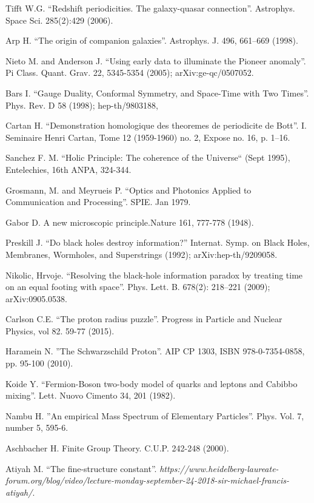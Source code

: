 \documentclass[twoside,draft]{article}
\begin{document}
\begin{sloppypar}
\begin{thebibliography}{99}
 Tifft W.G. ``Redshift periodicities. The galaxy-quasar
connection''. Astrophys. Space Sci. 285(2):429 (2006).

 Arp H. ``The origin of companion galaxies''. Astrophys. J. 496,
661--669 (1998).

 Nieto M. and Anderson J. ``Using early data to illuminate the
Pioneer anomaly''. Pi Class. Quant. Grav. 22, 5345-5354 (2005);
arXiv:ge-qc/0507052.

 Bars I. ``Gauge Duality, Conformal Symmetry, and Space-Time with
Two Times''. Phys. Rev. D 58 (1998); hep-th/9803188, 

 Cartan H. ``Demonstration homologique des theoremes de periodicite
de Bott''. I. Seminaire Henri Cartan, Tome 12 (1959-1960) no. 2, Expose no. 16,
p. 1--16.

 Sanchez F. M. ``Holic Principle: The coherence of the Universe`` (Sept 1995), Entelechies, 16th ANPA, 324-344.

 Grosmann, M. and Meyrueis P. ``Optics and Photonics Applied to Communication and Processing''. SPIE.  Jan 1979.

 Gabor D. A new microscopic principle.Nature 161, 777-778 (1948). 

 Preskill J. ``Do black holes destroy information?'' Internat.
Symp. on Black Holes, Membranes, Wormholes, and Superstrings (1992);
arXiv:hep-th/9209058.

 Nikolic, Hrvoje. ``Resolving the black-hole information paradox by
treating time on an equal footing with space''. Phys. Lett. B. 678(2):
218--221 (2009); arXiv:0905.0538.

 Carlson C.E. ``The proton radius puzzle''. Progress in Particle and Nuclear Physics, vol 82. 59-77 (2015).

 Haramein N. ''The Schwarzschild Proton''. AIP CP 1303, ISBN 978-0-7354-0858, pp. 95-100 (2010).

 Koide Y. ``Fermion-Boson two-body model of quarks and leptons and
Cabibbo mixing''.  Lett. Nuovo Cimento 34, 201 (1982).

 Nambu H. ''An empirical Mass Spectrum of Elementary Particles''. Phys. Vol. 7, number 5, 595-6.

 Aschbacher H. Finite Group Theory. C.U.P. 242-248 (2000). 

 Atiyah M. ``The fine-structure constant''. {\it https://www.heidelberg-laureate-forum.org/blog/video/lecture-monday-september-24-2018-sir-michael-francis-atiyah/}.


\end{thebibliography}
\end{sloppypar}
\end{document}
